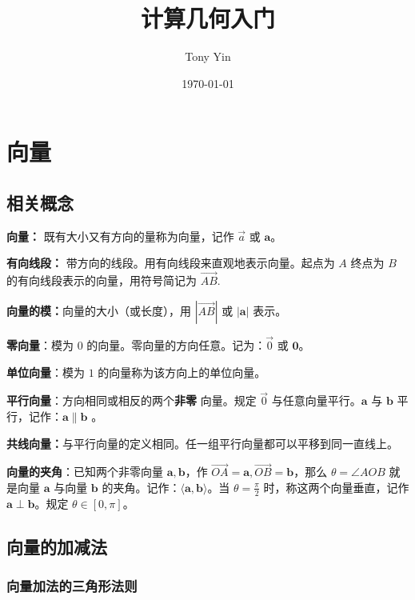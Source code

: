 \documentclass[a4paper, UTF8]{ctexart}
\title{计算几何入门}
\author{Tony Yin}
\date{\today}
\begin{document}
\songti
\maketitle
\pagestyle{plain}

\section{向量}

\subsection{相关概念}

\textbf{向量：} 既有大小又有方向的量称为向量，记作 $\vec {a}$ 或
$\boldsymbol a$。

\textbf{有向线段：} 带方向的线段。用有向线段来直观地表示向量。起点为
$A$ 终点为 $B$ 的有向线段表示的向量，用符号简记为
$\overrightarrow{AB}$.

\textbf{向量的模：}向量的大小（或长度），用 $|\overrightarrow{AB}|$ 或
$|\boldsymbol{a}|$ 表示。

\textbf{零向量}：模为 $0$ 的向量。零向量的方向任意。记为：$\vec 0$
或 $\boldsymbol{0}$。

\textbf{单位向量}：模为 $1$ 的向量称为该方向上的单位向量。

\textbf{平行向量}：方向相同或相反的两个\textbf{非零} 向量。规定
$\vec 0$ 与任意向量平行。$\boldsymbol{a}$ 与 $\boldsymbol{b}$
平行，记作：$\boldsymbol{a}\parallel \boldsymbol{b}$ 。

\textbf{共线向量：}与平行向量的定义相同。任一组平行向量都可以平移到同一直线上。

\textbf{向量的夹角}：已知两个非零向量
$\boldsymbol a,\boldsymbol b$，作
$\overrightarrow{OA}=\boldsymbol a,\overrightarrow{OB}=\boldsymbol b$，那么
$\theta=\angle AOB$ 就是向量 $\boldsymbol a$ 与向量
$\boldsymbol b$
的夹角。记作：$\langle \boldsymbol a,\boldsymbol b\rangle$。当
$\theta=\frac{\pi}{2}$ 时，称这两个向量垂直，记作
$\boldsymbol a\perp \boldsymbol b$。规定 $\theta \in [0,\pi]$。

\subsection{向量的加减法}

\subsubsection{向量加法的三角形法则}
\end{document}
